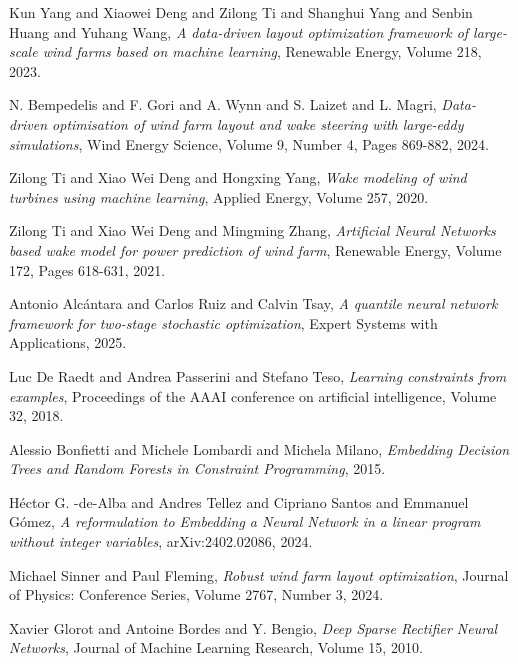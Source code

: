 \documentclass[preprint,12pt]{elsarticle}
\begin{document}
\begin{thebibliography}{00}
Kun Yang and Xiaowei Deng and Zilong Ti and Shanghui Yang and Senbin Huang and Yuhang Wang,
\textit{A data-driven layout optimization framework of large-scale wind farms based on machine learning},
Renewable Energy,
Volume 218,
2023.

N. Bempedelis and F. Gori and A. Wynn and S. Laizet and L. Magri,
\textit{Data-driven optimisation of wind farm layout and wake steering with large-eddy simulations},
Wind Energy Science,
Volume 9,
Number 4,
Pages 869-882,
2024.

Zilong Ti and Xiao Wei Deng and Hongxing Yang,
\textit{Wake modeling of wind turbines using machine learning},
Applied Energy,
Volume 257,
2020.

Zilong Ti and Xiao Wei Deng and Mingming Zhang,
\textit{Artificial Neural Networks based wake model for power prediction of wind farm},
Renewable Energy,
Volume 172,
Pages 618-631,
2021.

Antonio Alcántara and Carlos Ruiz and Calvin Tsay,
\textit{A quantile neural network framework for two-stage stochastic optimization},
Expert Systems with Applications,
2025.

Luc De Raedt and Andrea Passerini and Stefano Teso,
\textit{Learning constraints from examples},
Proceedings of the AAAI conference on artificial intelligence,
Volume 32,
2018.

Alessio Bonfietti and Michele Lombardi and Michela Milano,
\textit{Embedding Decision Trees and Random Forests in Constraint Programming},
2015.

Héctor G. -de-Alba and Andres Tellez and Cipriano Santos and Emmanuel Gómez,
\textit{A reformulation to Embedding a Neural Network in a linear program without integer variables},
arXiv:2402.02086,
2024.

Michael Sinner and Paul Fleming,
\textit{Robust wind farm layout optimization},
Journal of Physics: Conference Series,
Volume 2767,
Number 3,
2024.

Xavier Glorot and Antoine Bordes and Y. Bengio,
\textit{Deep Sparse Rectifier Neural Networks},
Journal of Machine Learning Research,
Volume 15,
2010.


\end{thebibliography}
\end{document}
